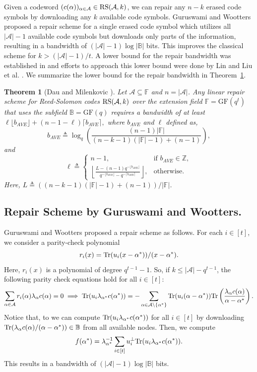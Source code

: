 \documentclass[onecolumn]{IEEEtran}
\theoremstyle{plain}
\newtheorem{theorem}{Theorem}
\theoremstyle{definition}
\newcommand{\FF}{\mathbb{F}}
\newcommand{\BB}{\mathbb{B}}
\newcommand{\GF}{{\mathrm{GF}}}
\newcommand{\cA}{\mathcal{A}}
\newcommand{\rs}{{\rm RS}}
\newcommand{\tr}{{\rm Tr}}
\begin{document}
Given a codeword $(c(\alpha))_{\alpha\in\cA}\in\rs(\cA,k)$, we can repair any $n-k$ erased code symbols by downloading any $k$ available code symbols. Guruswami and Wootters \cite{guruswamiwooters2017} proposed a repair scheme for a single erased code symbol which utilizes all $|\cA|-1$ available code symbols but downloads only parts of the information, resulting in a bandwidth of $(|\cA|-1)\log|\BB|$ bits. This improves the classical scheme for $k>(|\cA|-1)/t$. A lower bound for the repair bandwidth was established in \cite{Dau2017} and efforts to approach this lower bound were done by Lin \cite{Lin2023} and Liu et al. \cite{Liu2024}. We summarize the lower bound for the repair bandwidth in Theorem~\ref{thm:lower_bound}. 
\begin{theorem}[Dau and Milenkovic \cite{Dau2017}]\label{thm:lower_bound}
    Let $\cA \subseteq \FF$ and $n = |\cA|$. Any linear repair scheme for Reed-Solomon codes $\rs(\cA,k)$ over the extension field $\FF = \GF(q^t)$ that uses the subfield
$\BB= \GF(q)$ requires a bandwidth of at least
$
\ell \lfloor b_{AVE}\rfloor + (n-1-\ell) \lceil b_{AVE} \rceil,
$
where $b_{AVE}$ and $\ell$ defined as,
$$
b_{AVE} \triangleq \log_q \left(\frac{(n-1)|\FF|}{(n-k-1)(|\FF|-1)+(n-1)}\right),
$$
and
$$
\ell \triangleq \begin{cases}
    n-1,&\text{if } b_{AVE}\in\mathbb{Z},\\
    \left\lfloor\frac{L - (n-1)q^{-\lfloor b_{AVE}\rfloor}}{q^{-\lfloor b_{AVE}\rfloor} - q^{-\lceil b_{AVE}\rceil}}\right\rfloor, &\text{otherwise}.
\end{cases}
$$
Here, $L \triangleq ((n-k-1)(|\FF|-1)+(n-1))/|\FF|$.
\end{theorem}

{\color{black} 
\subsection{Repair Scheme by Guruswami and Wootters.}
Guruswami and Wootters \cite{guruswamiwooters2017} proposed a repair scheme as follows. For each $i\in[t]$, we consider a parity-check polynomial
$$
r_i(x) = \tr(u_i(x-\alpha^*))/(x-\alpha^*).
$$
Here, $r_i(x)$ is a polynomial of degree $q^{t-1}-1$. So, if $k \le |\cA| - q^{t-1}$, the following parity check equations hold for all $i\in[t]$:
\begin{align*}
    \sum_{\alpha\in\cA} r_i(\alpha)\lambda_\alpha c(\alpha) = 0 \implies
     \tr(u_i\lambda_{\alpha^*}c(\alpha^*)) = -\sum_{\alpha\in\cA\setminus\{\alpha^*\}} \tr(u_i(\alpha-\alpha^*))\tr\left(\frac{\lambda_\alpha c(\alpha)}{\alpha-\alpha^*}\right).
\end{align*}
Notice that, to we can compute $\tr(u_i \lambda_{\alpha^*}c(\alpha^*))$ for all $i\in[t]$ by downloading $\tr(\lambda_\alpha c(\alpha)/(\alpha-\alpha^*))\in\BB$ from all available nodes. Then, we compute
$$
f(\alpha^*) = \lambda_{\alpha^*}^{-1}\sum_{i\in[t]} u_i^\perp \tr(u_i \lambda_{\alpha^*} c(\alpha^*)).
$$
This results in a bandwidth of $(|\cA| - 1)\log|\BB|$ bits.}
\end{document}
